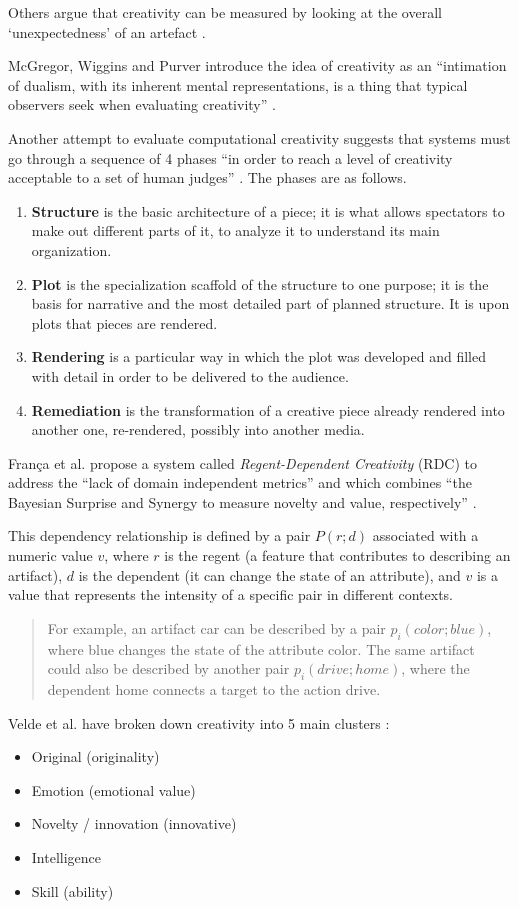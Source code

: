 Others argue that creativity can be measured by looking at the overall `unexpectedness' of an artefact \autocite{Kazjon2014}. 

McGregor, Wiggins and Purver introduce the idea of creativity as an ``intimation of dualism, with its inherent mental representations, is a thing that typical observers seek when evaluating creativity'' \autocite*{Mcgregor2014}.

Another attempt to evaluate computational creativity suggests that systems must go through a sequence of 4 phases ``in order to reach a level of creativity acceptable to a set of human judges'' \autocite{Negrete2014}. The phases are as follows.

\begin{enumerate}
  \item \textbf{Structure} is the basic architecture of a piece; it is what allows spectators to make out different parts of it, to analyze it to understand its main organization.
  \item \textbf{Plot} is the specialization scaffold of the structure to one purpose; it is the basis for narrative and the most detailed part of planned structure. It is upon plots that pieces are rendered.
  \item \textbf{Rendering} is a particular way in which the plot was developed and filled with detail in order to be delivered to the audience.
  \item \textbf{Remediation} is the transformation of a creative piece already rendered into another one, re-rendered, possibly into another media.
\end{enumerate}

Fran\c{c}a et al. propose a system called \textit{Regent-Dependent Creativity} (RDC) to address the ``lack of domain independent metrics'' and which combines ``the Bayesian Surprise and Synergy to measure novelty and value, respectively'' \autocite*{Franca2016}. 

This dependency relationship is defined by a pair $P(r; d)$ associated with a numeric value $v$, where $r$ is the regent (a feature that contributes to describing an artifact), $d$ is the dependent (it can change the state of an attribute), and $v$ is a value that represents the intensity of a specific pair in different contexts. 

\begin{quotation}
  For example, an artifact car can be described by a pair $p_i(color; blue)$, where blue changes the state of the attribute color. The same artifact could also be described by another pair $p_i(drive; home)$, where the dependent home connects a target to the action drive. 
\end{quotation}

Velde et al. have broken down creativity into 5 main clusters \autocite*{Velde2015}:

\begin{itemize}
  \item Original (originality)
  \item Emotion (emotional value)
  \item Novelty / innovation (innovative)
  \item Intelligence
  \item Skill (ability)
\end{itemize}






\stopcontents[chapters]
